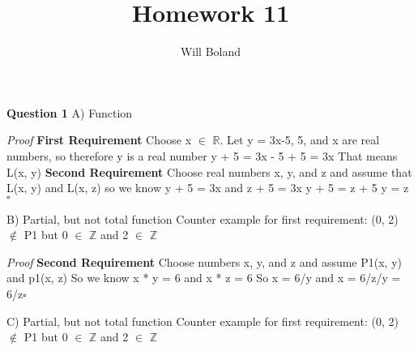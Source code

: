 \documentclass{article}
\begin{document}
\title{Homework 11}
\author{Will Boland}
\maketitle

\textbf{Question 1}\newline
A) Function\newline

\textit{Proof}\newline
\textbf{First Requirement}\newline
Choose x $\in$ $\mathbb{R}$.\newline
 Let y = 3x-5, 5, and x are real numbers, so therefore y is a real number\newline
y + 5 = 3x - 5 + 5\newline
= 3x\newline
That means L(x, y)\newline
\textbf{Second Requirement}\newline
Choose real numbers x, y, and z and assume that L(x, y) and L(x, z)\newline
so we know y + 5 = 3x and z + 5 = 3x\newline
y + 5 = z + 5\newline
y = z $\square$\newline\newline

B) Partial, but not total function\newline
Counter example for first requirement: (0, 2) $\notin$ P1 but 0 $\in$ $\mathbb{Z}$ and 2 $\in$ $\mathbb{Z}$\newline

\textit{Proof}\newline
\textbf{Second Requirement}\newline
Choose numbers x, y, and z and assume P1(x, y) and p1(x, z)\newline
So we know x * y = 6 and x * z = 6\newline
So x = 6/y and x = 6/z/y = 6/z$\square$\newline\newline

C) Partial, but not total function\newline
Counter example for first requirement: (0, 2) $\notin$ P1 but 0 $\in$ $\mathbb{Z}$ and 2 $\in$ $\mathbb{Z}$\newline
\end{document}
